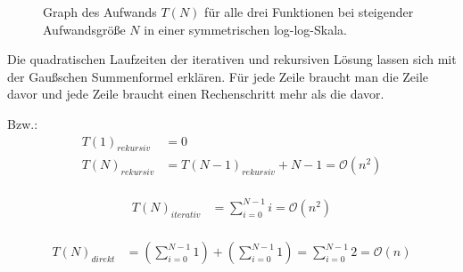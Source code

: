 \documentclass[paper=a4, fontsize=11pt]{scrartcl} %
\numberwithin{equation}{section} %
\numberwithin{figure}{section} %
\numberwithin{table}{section} %
\begin{document}
\begin{figure}[h]
  \centering
  \caption{Graph des Aufwands $T(N)$ f\"ur alle drei Funktionen bei steigender Aufwandsgr\"o{\ss}e $N$ in einer symmetrischen log-log-Skala.}
  \label{figure:loglogeq}
\end{figure}

Die quadratischen Laufzeiten der iterativen und rekursiven L\"osung lassen sich
mit der Gau{\ss}schen Summenformel erkl\"aren. F\"ur jede Zeile braucht man die
Zeile davor und jede Zeile braucht einen Rechenschritt mehr als die davor.

Bzw.:
\begin{equation}
  \begin{split}
    T(1)_{rekursiv} &= 0 \\
    T(N)_{rekursiv} &= T(N-1)_{rekursiv} + N - 1 = \mathcal{O}(n^2)\\
  \end{split}
\end{equation}

\begin{equation}
  \begin{split}
    T(N)_{iterativ} &= \sum_{i=0}^{N-1} i = \mathcal{O}(n^2)\\
  \end{split}
\end{equation}

\begin{equation}
  \begin{split}
    T(N)_{direkt} &= \left(\sum_{i=0}^{N-1} 1\right) + \left(\sum_{i=0}^{N-1} 1\right) = \sum_{i=0}^{N-1} 2 = \mathcal{O}(n)\\
  \end{split}
\end{equation}
\end{document}
